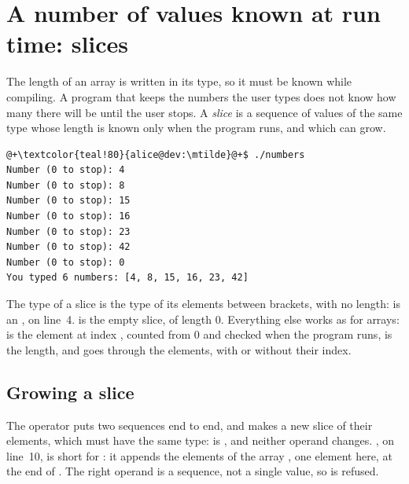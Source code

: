 \vfill\pagebreak
\section{A number of values known at run time: slices}
\label{sec:collections:slices}

The length of an array is written in its type, so it must be known while
compiling. A program that keeps the numbers the user types does not know how
many there will be until the user stops. A \textit{slice} is a sequence of
values of the same type whose length is known only when the program runs, and
which can grow.


\vspace{-10pt}%
\begin{lstlisting}[style=bashVerb, escapechar=@+]
@+\textcolor{teal!80}{alice@dev:\mtilde}@+$ ./numbers
Number (0 to stop): 4
Number (0 to stop): 8
Number (0 to stop): 15
Number (0 to stop): 16
Number (0 to stop): 23
Number (0 to stop): 42
Number (0 to stop): 0
You typed 6 numbers: [4, 8, 15, 16, 23, 42]
\end{lstlisting}

The type of a slice is the type of its elements between brackets, with no
length:  is an \token{[i32]}, on line~4. \token{[]} is the empty
slice, of length 0. Everything else works as for arrays:  is
the element at index , counted from 0 and checked when the program
runs,  is the length, and  goes through the
elements, with or without their index.

\subsection{Growing a slice}

The operator \tokennolst{\mtildeascii{}} puts two sequences end to end, and
makes a new slice of their elements, which must have the same type:
\tokennolst{[1, 2] \mtildeascii{} [3]} is \token{[1, 2, 3]}, and neither
operand changes. , on line~10, is
short for : it appends the
elements of the array \token{[n]}, one element here, at the end of
. The right operand is a sequence, not a single value, so
 is refused.

